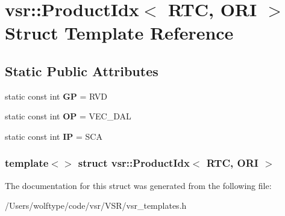 \hypertarget{structvsr_1_1_product_idx_3_01_r_t_c_00_01_o_r_i_01_4}{\section{vsr\-:\-:Product\-Idx$<$ R\-T\-C, O\-R\-I $>$ Struct Template Reference}
\label{structvsr_1_1_product_idx_3_01_r_t_c_00_01_o_r_i_01_4}
}
\subsection*{Static Public Attributes}
\begin{DoxyCompactItemize}
\item 
\hypertarget{structvsr_1_1_product_idx_3_01_r_t_c_00_01_o_r_i_01_4_a0eb8469fa4764c11409128b802090a3f}{static const int {\bfseries G\-P} = R\-V\-D}\label{structvsr_1_1_product_idx_3_01_r_t_c_00_01_o_r_i_01_4_a0eb8469fa4764c11409128b802090a3f}

\item 
\hypertarget{structvsr_1_1_product_idx_3_01_r_t_c_00_01_o_r_i_01_4_a38239cc0121fbb9758cf44d399b86e30}{static const int {\bfseries O\-P} = V\-E\-C\-\_\-\-D\-A\-L}\label{structvsr_1_1_product_idx_3_01_r_t_c_00_01_o_r_i_01_4_a38239cc0121fbb9758cf44d399b86e30}

\item 
\hypertarget{structvsr_1_1_product_idx_3_01_r_t_c_00_01_o_r_i_01_4_a36912d076b2a13b00fa9d69256079159}{static const int {\bfseries I\-P} = S\-C\-A}\label{structvsr_1_1_product_idx_3_01_r_t_c_00_01_o_r_i_01_4_a36912d076b2a13b00fa9d69256079159}

\end{DoxyCompactItemize}
\subsubsection*{template$<$$>$ struct vsr\-::\-Product\-Idx$<$ R\-T\-C, O\-R\-I $>$}



The documentation for this struct was generated from the following file\-:\begin{DoxyCompactItemize}
\item 
/\-Users/wolftype/code/vsr/\-V\-S\-R/vsr\-\_\-templates.\-h\end{DoxyCompactItemize}

